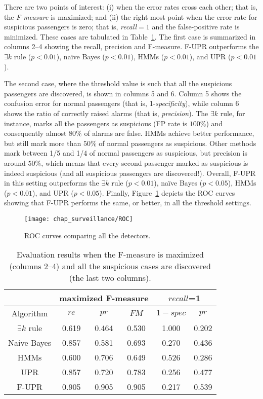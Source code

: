 There are two points of interest: (i) when the error rates cross each other; that is, the \emph{F-measure} is maximized; and (ii) the right-most point when the error rate for suspicious passengers is zero; that is, \emph{recall}$=1$ and the false-positive rate is minimized. These cases are tabulated in Table~\ref{tab:fmeasure}. The first case is summarized in columns 2--4 showing the  recall, precision and F-measure. F-UPR outperforms the $\exists k$ rule ($p<0.01$), na{\"i}ve Bayes ($p<0.01$), HMMs ($p<0.01$), and UPR ($p<0.01$). 
{The second case, where the threshold value is such that all the suspicious passengers are discovered, is shown in columns 5 and 6. Column 5 shows the confusion error for normal passengers (that is, 1-\emph{specificity}), while column 6 shows the ratio of correctly raised alarms (that is, \emph{precision}). The $\exists k$ rule, for instance, marks all the passengers as suspicious (FP rate is $100\%$) and consequently almost $80\%$ of alarms are false. HMMs achieve better performance, but still mark more than $50\%$ of normal passengers as suspicious. Other methods mark between 1/5 and 1/4 of normal passengers as suspicious, but precision is around $50\%$, which means that every second passenger marked as suspicious is indeed suspicious (and all suspicious passengers are discovered!). Overall, F-UPR in this setting outperforms the $\exists k$ rule ($p<0.01$), na{\"i}ve Bayes ($p<0.05$), HMMs ($p<0.01$), and UPR ($p<0.05$).
Finally, Figure~\ref{fig:ROC} depicts the ROC curves showing that F-UPR performs the same, or better, in all the threshold settings. 

\begin{figure}[!ht]
\centering
\texttt{[image: chap\_surveillance/ROC]}
\caption{ROC curves comparing all the detectors.}
\label{fig:ROC}
\end{figure}

\begin{table}
\centering
\caption{Evaluation results when the F-measure is maximized (columns 2--4) and all the suspicious cases are discovered (the last two columns).}
\renewcommand{\arraystretch}{1.2}
\begin{tabular}{c|ccc|cc}
	\hline
						&	\multicolumn{3}{c|}{maximized F-measure}		&	\multicolumn{2}{c}{$recall$=1}		\\
	\hline
		Algorithm					& $re$	& $pr$	& $FM$		& $1-spec$		& $pr$\\		
	\hline
	$\exists k$ rule		& 0.619		& 0.464		& 0.530		& 1.000		& 0.202		\\		
	Naive Bayes				& 0.857		& 0.581		& 0.693		& 0.270		& 0.436		\\
	HMMs						& 0.600		& 0.706		& 0.649		& 0.526		& 0.286		\\
	UPR						& 0.857		& 0.720		& 0.783		& 0.256		& 0.477		\\
	F-UPR						& 0.905		& 0.905		& 0.905		& 0.217		& 0.539		\\
	\hline
\end{tabular}
\label{tab:fmeasure}
\end{table}

}
